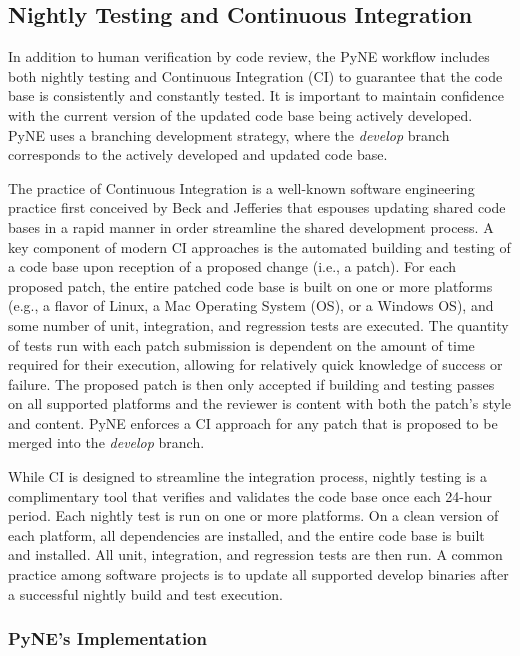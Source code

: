 \documentclass{anstrans}
\begin{document}

\subsection{Nightly Testing and Continuous Integration} 

In addition to human verification by code review, the PyNE
workflow includes both nightly testing and Continuous Integration (CI) to
guarantee that the code base is consistently and constantly tested.
It is important to maintain confidence with the current version of
the updated code base being actively developed. PyNE uses a branching
development strategy, where the \textit{develop} branch corresponds to the
actively developed and updated code base.

The practice of Continuous Integration is a well-known software engineering
practice first conceived by Beck and Jefferies \cite{beck1998extreme} that
espouses updating shared code bases in a rapid manner in order streamline the
shared development process. A key component of modern CI approaches is the
automated building and testing of a code base upon reception of a proposed
change (i.e., a patch). For each proposed patch, the entire patched code base is
built on one or more platforms (e.g., a flavor of Linux, a Mac Operating System
(OS), or a Windows OS), and some number of unit, integration, and regression
tests are executed. The quantity of tests run with each patch submission is
dependent on the amount of time required for their execution, allowing for
relatively quick knowledge of success or failure. The proposed patch is then only
accepted if building and testing passes on all supported platforms and the
reviewer is content with both the patch's style and content. PyNE enforces a CI
approach for any patch that is proposed to be merged into the \textit{develop}
branch.

While CI is designed to streamline the integration process, nightly testing is a
complimentary tool that verifies and validates the code base once each 24-hour
period. Each nightly test is run on one or more platforms. On a clean version of
each platform, all dependencies are installed, and the entire code base is built
and installed. All unit, integration, and regression tests are then run. A
common practice among software projects is to update all supported develop
binaries after a successful nightly build and test execution.

\subsubsection{PyNE's Implementation}
\end{document}
